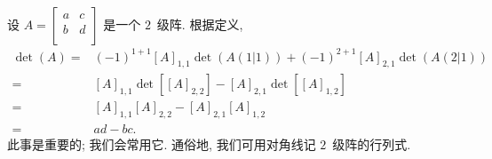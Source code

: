 \documentclass[../libro.tex]{subfiles}
\begin{document}
\begin{example}
    设
    \(
        A =
        \begin{bmatrix}
            a & c \\
            b & d \\
        \end{bmatrix}
    \)
    是一个 \(2\)~级阵.
    根据定义,
    \begin{align*}
        \det {(A)}
        = {} &
        (-1)^{1+1} [A]_{1,1} \det {(A(1|1))}
        + (-1)^{2+1} [A]_{2,1} \det {(A(2|1))}
        \\
        = {} &
        [A]_{1,1} \det {[[A]_{2,2}]}
        - [A]_{2,1} \det {[[A]_{1,2}]}
        \\
        = {} &
        [A]_{1,1} [A]_{2,2} - [A]_{2,1} [A]_{1,2}
        \\
        = {} &
        ad - bc.
    \end{align*}
    此事是重要的;
    我们会常用它.
    通俗地, 我们可用对角线记
    \(2\)~级阵的行列式.
    \begin{figure}[h!]
        \centering
    \end{figure}

    \mbox{} %
\end{example}
\end{document}
